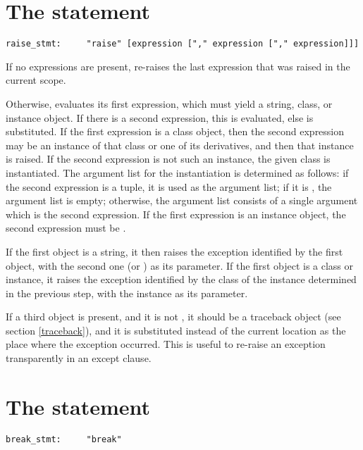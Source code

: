 \section{The  statement \label{raise}}

\begin{verbatim}
raise_stmt:     "raise" [expression ["," expression ["," expression]]]
\end{verbatim}

If no expressions are present,  re-raises the last
expression that was raised in the current scope.

Otherwise,  evaluates its first expression, which must yield
a string, class, or instance object.  If there is a second expression,
this is evaluated, else  is substituted.  If the first
expression is a class object, then the second expression may be an
instance of that class or one of its derivatives, and then that
instance is raised.  If the second expression is not such an instance,
the given class is instantiated.  The argument list for the
instantiation is determined as follows: if the second expression is a
tuple, it is used as the argument list; if it is , the
argument list is empty; otherwise, the argument list consists of a
single argument which is the second expression.  If the first
expression is an instance object, the second expression must be
.

If the first object is a string, it then raises the exception
identified by the first object, with the second one (or )
as its parameter.  If the first object is a class or instance,
it raises the exception identified by the class of the instance
determined in the previous step, with the instance as
its parameter.

If a third object is present, and it is not , it should be
a traceback object (see section \ref{traceback}), and it is
substituted instead of the current location as the place where the
exception occurred.  This is useful to re-raise an exception
transparently in an except clause.

\section{The  statement \label{break}}

\begin{verbatim}
break_stmt:     "break"
\end{verbatim}

